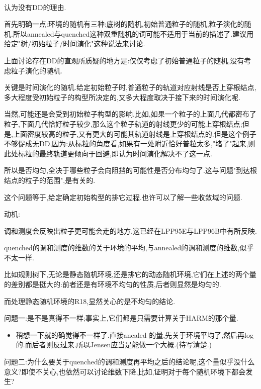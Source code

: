 \documentclass[a4paper,oneside]{ctexbook}
\begin{document}
				\begin{conjec}
					\ 

					认为没有DD的理由.

					首先明确一点:环境的随机有三种:底树的随机,初始普通粒子的随机,粒子演化的随机.所以annealed与quenched这种双重随机的词可能不适用于当前的描述了.建议用给定"树/初始粒子/时间演化"这种说法来讨论.

					上面讨论存在DD的直观所质疑的地方是:仅仅考虑了初始普通粒子的随机,没有考虑粒子演化的随机.					

					关键是时间演化的随机.给定初始粒子时,普通粒子的轨道对应射线是否上穿根结点,多大程度受初始粒子的构型所决定的,又多大程度取决于接下来的时间演化呢.

					当然,可能还是会受到初始粒子构型的影响.比如,如果一个粒子的上面几代都密布了粒子,下面几代恰好粒子较少,那么这个粒子轨道的射线更少的可能上穿根结点;但是,上面密度较高的粒子,又有更大的可能其轨道射线是上穿根结点的.但是这个例子不够促成无DD,因为:从标粒的角度看,如果有一处附近恰好普粒太多,"堵了"起来,则此处标粒的最终轨道更倾向于回避,即认为时间演化解决不了这一点.

					所以是否均匀,全决于哪些粒子会向阻挡的可能性是否分布均匀了.这与问题"到达根结点的粒子的范围",是有关的.

					这个问题等于,给定确定初始构型的排它过程.也许可以了解一些收敛域的问题.
				\end{conjec}

			动机:

				调和测度会反映出粒子更可能会走的地方.这已经在LPP95E与LPP96B中有所反映.

			\begin{que}
				quenched的调和测度的维数的关于环境的平均,与annealed的调和测度的维数,似乎不太一样.

				比如规则树下,无论是静态随机环境,还是排它的动态随机环境,它们在上述的两个量的差别都是挺大的:前者还是有环境不均匀的性质,后者则显然是均匀的.

				而处理静态随机环境的R18,显然关心的是不均匀的结论.

				问题一:是不是真得不一样;事实上,它们都是只需要计算关于HARM的那个量.

				\begin{itemize}
				\item 稍想一下就的确觉得不一样了.直接anealed 的量,先关于环境平均了,然后再log的.而后者则反过来.所以Jensen应当是能做一个大概.(待写清楚.)
				\end{itemize}

				问题二:为什么要关于quenched的调和测度再平均之后的结论呢,这个量似乎没什么意义?即使不关心,也依然可以讨论维数下降,比如,证明对于每个随机环境下都会发生?
			\end{que}
\end{document}
